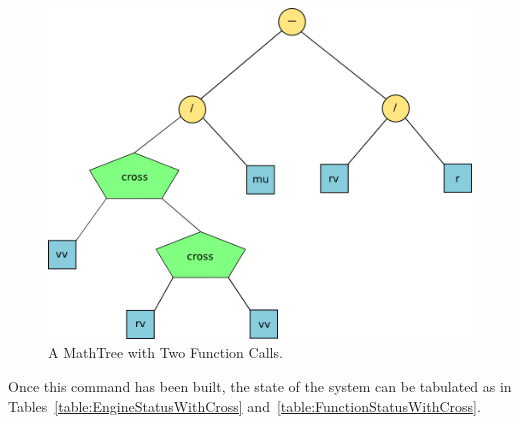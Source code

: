 \begin{figure}[htb]
\begin{center}
\includegraphics[248,194]{Images/CrossMathTree.png}
\caption{\label{figure:TwoFunMathTree}A MathTree with Two Function Calls.}
\end{center}
\end{figure}

\noindent Once this command has been built, the state of the system can be tabulated as in
Tables~\ref{table:EngineStatusWithCross} and~\ref{table:FunctionStatusWithCross}.

